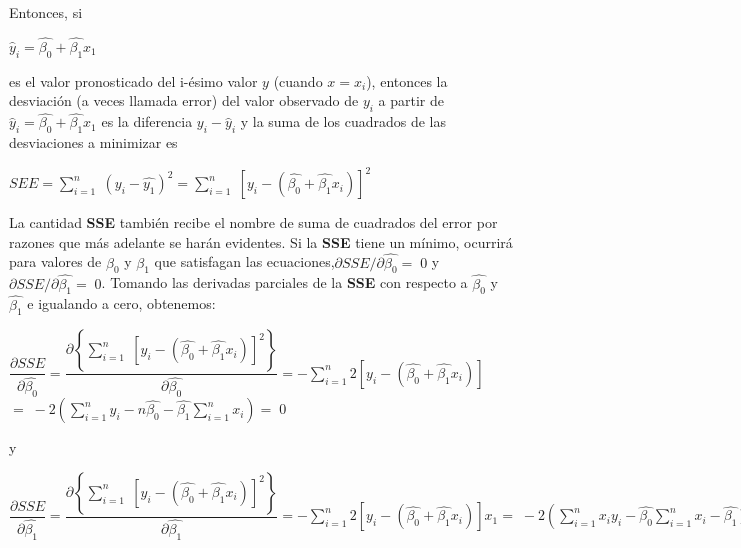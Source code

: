 Entonces, si	

\begin{center}
	{\large $\hat{y}_{i} =\hat{\beta_{0}}+\hat{\beta_{1}}x_{1}$}
\end{center}

es el valor pronosticado del i-ésimo valor $y$ (cuando $x = x_{i}$), entonces la desviación (a veces llamada error) del valor observado de $y_{i}$ a partir de $\hat{y}_{i} =\hat{\beta_{0}}+\hat{\beta_{1}}x_{1}$ es la diferencia $y_{i} - \hat{y}_{i}$ y la suma de los cuadrados de las desviaciones a minimizar es

\begin{center}
	{\large $\displaystyle SEE=\sum_{i=1}^{n} \; \left(y_{i}-\hat{y_{1}} \right)^{2}= \sum_{i=1}^{n} \; \left[y_{i} -\left( \hat{\beta_{0}} + \hat{\beta_{1}}x_{i} \right)  \right]^{2}$}
\end{center}

La cantidad \textbf{SSE} también recibe el nombre de suma de cuadrados del error por razones que más adelante se harán evidentes. Si la \textbf{SSE} tiene un mínimo, ocurrirá para valores de $\beta_{0}$ y $\beta_{1}$ que satisfagan las ecuaciones,$\partial SSE/\partial  \hat{\beta_{0}} =\;0$ y $\partial SSE/\partial  \hat{\beta_{1}} =\;0$. Tomando las derivadas parciales de la \textbf{SSE} con respecto a
$\hat{\beta_{0}}$ y $\hat{\beta_{1}}$ e igualando a cero, obtenemos:\\



\begin{center}
$
\dfrac{\partial SSE}{\partial \hat{\beta_{0}} }=\dfrac{\partial \left\lbrace \sum_{i=1}^{n} \; \left[ y_{i}-\left( \hat{\beta_{0}} + \hat{\beta_{1}}x_{i} \right)  \right]^{2} \right\rbrace }{\partial\hat{\beta_{0}}}=-\sum_{i=1}^{n} 2 \left[y_{i} -\left( \hat{\beta_{0}} + \hat{\beta_{1}}x_{i} \right)  \right]
$
$=\;-2\left(\sum_{i=1}^{n}y_{i}-n\hat{\beta_{0}}-\hat{\beta_{1}}  \sum_{i=1}^{n} x_{i}\right)=\;0$	
\end{center}

y


\begin{center}
$
\dfrac{\partial SSE}{\partial \hat{\beta_{1}} }=\dfrac{\partial \left\lbrace \sum_{i=1}^{n} \; \left[ y_{i}-\left( \hat{\beta_{0}} + \hat{\beta_{1}}x_{i} \right)  \right]^{2} \right\rbrace }{\partial\hat{\beta_{1}}}=-\sum_{i=1}^{n} 2 \left[y_{i} -\left( \hat{\beta_{0}} + \hat{\beta_{1}}x_{i} \right)  \right]x_{1}
=\;-2\left(\sum_{i=1}^{n}x_{i} y_{i}-\hat{\beta_{0}}  \sum_{i=1}^{n}x_{i}-\hat{\beta_{1}}\sum_{i=1}^{n} x^{2}_{i}\right)=\;0$	
\end{center}



